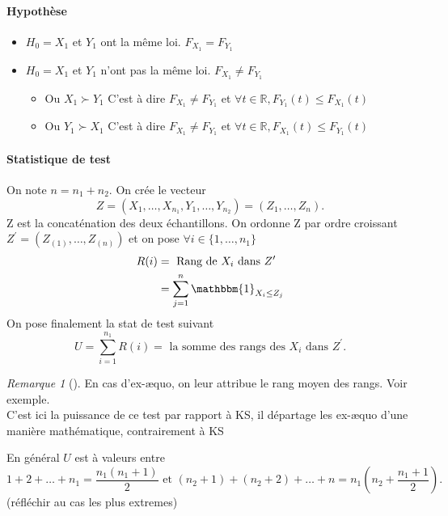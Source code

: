 \documentclass{article}
\theoremstyle{plain}%
\theoremstyle{definition}
\theoremstyle{remark}
\newtheorem*{rem}{Remarque}
\begin{document}
\paragraph*{Hypothèse}
\begin{itemize}
    \item $ H_0 = X_1 $ et $ Y_1 $ ont la même loi. $ F_{X_1} = F_{Y_1} $ 
    \item $ H_0 = X_1 $ et $ Y_1 $ n'ont pas la même loi. $ F_{X_1} \neq F_{Y_1} $ \begin{itemize}
        \item Ou $ X_1 \succ Y_1 $ C'est à dire $ F_{X_1} \neq F_{Y_1} $ et $ \forall t \in \mathbb{R}, F_{Y_1}(t) \leq F_{X_1}(t) $ 
        \item Ou $ Y_1 \succ X_1 $ C'est à dire $ F_{X_1} \neq F_{Y_1} $ et $ \forall t \in \mathbb{R}, F_{X_1}(t) \leq F_{Y_1}(t) $ 
    \end{itemize}
\end{itemize}

\paragraph*{Statistique de test}
On note $ n = n_1 + n_2 $. On crée le vecteur 
\[
    Z = (X_1, \dots, X_{n_1}, Y_1, \dots, Y_{n_2}) = (Z_1, \dots, Z_n)
.\]
Z est la concaténation des deux échantillons. On ordonne Z par ordre croissant $ Z^\prime = (Z_{(1)}, \dots, Z_{(n)}) $ et on pose $ \forall i \in \{1,\dots, n_1\} $ 
\begin{align*}
    R(i) &= \text{ Rang de } X_i \text{ dans } Z^\prime  \\
        &= \sum_{j=1}^{n}\mathbbm{1}_{X_i \leq Z_j}
\end{align*}
On pose finalement la stat de test suivant
\[
    U = \sum_{i=1}^{n_1}R(i) = \text{ la somme des rangs des } X_i \text{ dans } Z^\prime 
.\]
\begin{rem}[]
    En cas d'ex-æquo, on leur attribue le rang moyen des rangs. Voir exemple. \\
    C'est ici la puissance de ce test par rapport à KS, il départage les ex-æquo d'une manière mathématique, contrairement à KS
\end{rem}

En général $ U $ est à valeurs entre 
\[
    1 + 2 + \dots + n_1 = \frac{n_1 (n_1 + 1)}{2} \text{ et } (n_2+1) + (n_2 + 2) + \dots + n = n_1(n_2 + \frac{n_1 + 1}{2})
.\]
(réfléchir au cas les plus extremes)
\end{document}
